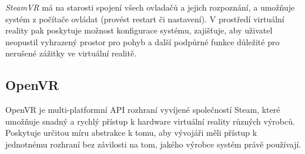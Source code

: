 \emph{SteamVR} má na starosti spojení všech ovladačů a jejich
rozpoznání, a umožňuje systém z počítače ovládat (provést restart či
nastavení). V prostředí virtuální reality pak poskytuje možnost
konfigurace systému, zajišťuje, aby uživatel neopustil vyhrazený prostor
pro pohyb a další podpůrné funkce důležité pro nerušené zážitky ve
virtuální realitě.

\subsection{OpenVR}\label{openvr}

OpenVR je multi-platformní API rozhraní vyvíjené společností Steam,
které umožňuje snadný a rychlý přístup k hardware virtuální reality
různých výrobců. Poskytuje určitou míru abstrakce k tomu, aby vývojáři
měli přístup k jednotnému rozhraní bez závilosti na tom, jakého výrobce
systém právě používají.
